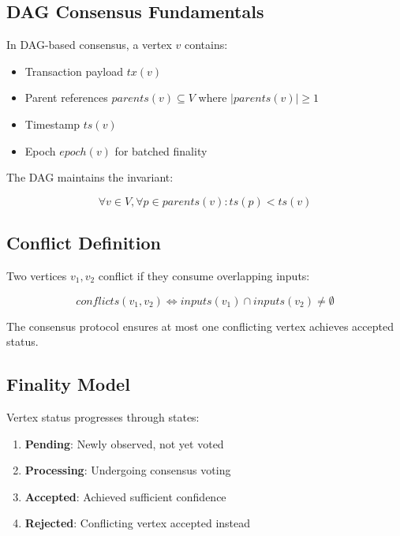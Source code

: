 \documentclass[11pt,twocolumn]{article}
\begin{document}
\subsection{DAG Consensus Fundamentals}

In DAG-based consensus, a vertex $v$ contains:

\begin{itemize}
\item Transaction payload $tx(v)$
\item Parent references $parents(v) \subseteq V$ where $|parents(v)| \geq 1$
\item Timestamp $ts(v)$
\item Epoch $epoch(v)$ for batched finality
\end{itemize}

The DAG maintains the invariant:

\begin{equation}
\forall v \in V, \forall p \in parents(v): ts(p) < ts(v)
\end{equation}

\subsection{Conflict Definition}

Two vertices $v_1, v_2$ conflict if they consume overlapping inputs:

\begin{equation}
conflicts(v_1, v_2) \Leftrightarrow inputs(v_1) \cap inputs(v_2) \neq \emptyset
\end{equation}

The consensus protocol ensures at most one conflicting vertex achieves accepted status.

\subsection{Finality Model}

Vertex status progresses through states:

\begin{enumerate}
\item \textbf{Pending}: Newly observed, not yet voted
\item \textbf{Processing}: Undergoing consensus voting
\item \textbf{Accepted}: Achieved sufficient confidence
\item \textbf{Rejected}: Conflicting vertex accepted instead
\end{enumerate}
\end{document}
